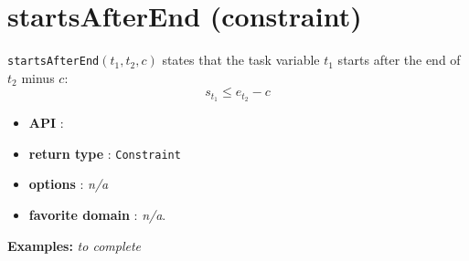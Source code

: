 \section{startsAfterEnd (constraint)}\label{startsafterend:startsafterendconstraint}\hypertarget{startsafterend:startsafterendconstraint}{}
\begin{notedef}
  \texttt{startsAfterEnd}$(t_1,t_2,c)$ states that the task variable $t_1$ starts after the end of $t_2$ minus $c$:
  $$s_{t_{1}} \le e_{t_{2}} - c$$
\end{notedef}

\begin{itemize}
	\item \textbf{API} :
	\item \textbf{return type} : \texttt{Constraint}
	\item \textbf{options} : \emph{n/a}
	\item \textbf{favorite domain} : \emph{n/a}.
\end{itemize}

\textbf{Examples:}
%
\emph{to complete}
